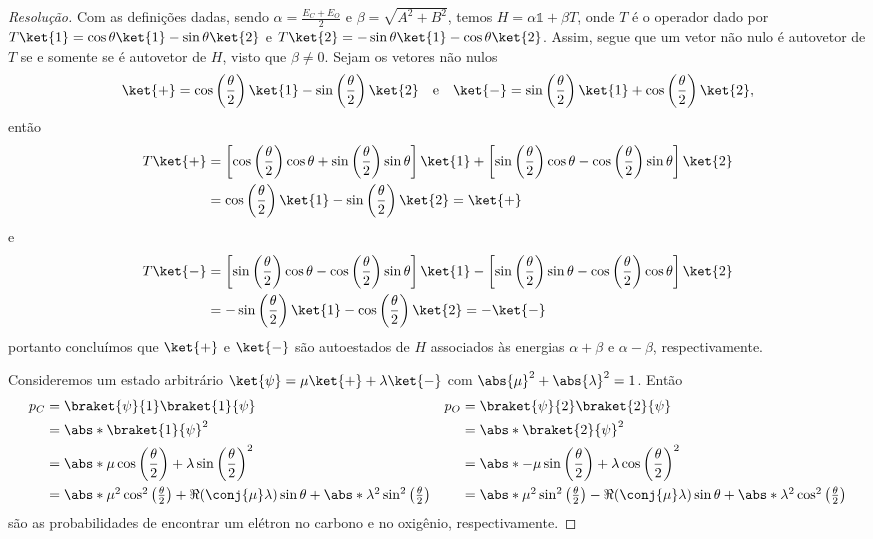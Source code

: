 \begin{proof}[Resolução]
    Com as definições dadas, sendo \(\alpha = \frac{E_C + E_O}{2}\) e \(\beta = \sqrt{A^2 + B^2}\), temos \(H = \alpha \mathds{1} + \beta T\), onde \(T\) é o operador dado por \(T\ket{1} = \cos\theta \ket{1} - \sin\theta \ket{2}\) e \(T\ket{2} = -\sin\theta\ket{1} - \cos\theta\ket{2}\). Assim, segue que um vetor não nulo é autovetor de \(T\) se e somente se é autovetor de \(H\), visto que \(\beta \neq 0\). Sejam os vetores não nulos
    \begin{equation*}
        \ket{+} = \cos\left(\frac{\theta}{2}\right)\ket{1} - \sin\left(\frac{\theta}{2}\right)\ket{2}
        \quad\text{e}\quad
        \ket{-} = \sin\left(\frac{\theta}{2}\right)\ket{1} + \cos\left(\frac{\theta}{2}\right)\ket{2},
    \end{equation*}
    então
    \begin{align*}
        T\ket{+} &= \left[\cos\left(\frac{\theta}{2}\right)\cos\theta + \sin\left(\frac{\theta}{2}\right)\sin\theta\right]\ket{1} + \left[\sin\left(\frac{\theta}{2}\right)\cos\theta - \cos\left(\frac{\theta}{2}\right)\sin\theta\right]\ket{2}\\
                 &= \cos\left(\frac{\theta}{2}\right)\ket{1} - \sin\left(\frac{\theta}{2}\right) \ket{2} = \ket{+}
    \end{align*}
    e
    \begin{align*}
        T\ket{-} &= \left[\sin\left(\frac{\theta}{2}\right)\cos\theta - \cos\left(\frac{\theta}{2}\right)\sin\theta\right]\ket{1} - \left[\sin\left(\frac{\theta}{2}\right)\sin\theta - \cos\left(\frac{\theta}{2}\right)\cos\theta\right]\ket{2}\\
                 &= -\sin\left(\frac{\theta}{2}\right)\ket{1} - \cos\left(\frac{\theta}{2}\right) \ket{2} = -\ket{-}
    \end{align*}
    portanto concluímos que \(\ket{+}\) e \(\ket{-}\) são autoestados de \(H\) associados às energias \(\alpha + \beta\) e \(\alpha - \beta\), respectivamente.

    Consideremos um estado arbitrário \(\ket{\psi} = \mu \ket{+} + \lambda \ket{-}\) com \(\abs{\mu}^2 + \abs{\lambda}^2 = 1\). Então
    \begin{align*}
        p_C &= \braket{\psi}{1}\braket{1}{\psi}&
        p_O &= \braket{\psi}{2}\braket{2}{\psi}\\
            &= \abs*{\braket{1}{\psi}}^2&
            &= \abs*{\braket{2}{\psi}}^2\\
            &= \abs*{\mu \cos\left(\frac{\theta}{2}\right) + \lambda \sin\left(\frac{\theta}{2}\right)}^2&
            &= \abs*{-\mu \sin\left(\frac{\theta}{2}\right) + \lambda \cos\left(\frac{\theta}{2}\right)}^2\\
            &= \textstyle\abs*{\mu}^2 \cos^2\left(\frac{\theta}{2}\right) + \Re(\conj{\mu}\lambda) \sin\theta + \abs*{\lambda}^2 \sin^2\left(\frac{\theta}{2}\right)&
            &= \textstyle\abs*{\mu}^2 \sin^2\left(\frac{\theta}{2}\right) - \Re(\conj{\mu}\lambda) \sin\theta + \abs*{\lambda}^2 \cos^2\left(\frac{\theta}{2}\right)
    \end{align*}
    são as probabilidades de encontrar um elétron no carbono e no oxigênio, respectivamente.
\end{proof}
